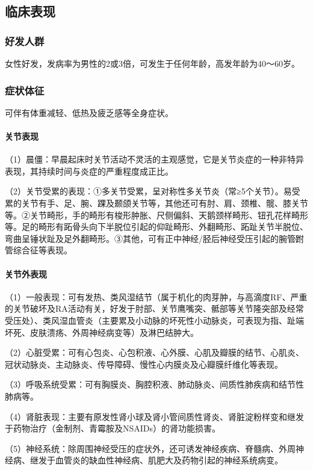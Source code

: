 \subsection{临床表现}

\subsubsection{好发人群}

女性好发，发病率为男性的2或3倍，可发生于任何年龄，高发年龄为40～60岁。

\subsubsection{症状体征}

可伴有体重减轻、低热及疲乏感等全身症状。
\paragraph{关节表现}

（1）晨僵：早晨起床时关节活动不灵活的主观感觉，它是关节炎症的一种非特异表现，其持续时间与炎症的严重程度成正比。

（2）关节受累的表现：①多关节受累，呈对称性多关节炎（常≥5个关节）。易受累的关节有手、足、腕、踝及颞颌关节等，其他还可有肘、肩、颈椎、髋、膝关节等。②关节畸形，手的畸形有梭形肿胀、尺侧偏斜、天鹅颈样畸形、钮孔花样畸形等。足的畸形有跖骨头向下半脱位引起的仰趾畸形、外翻畸形、跖趾关节半脱位、弯曲呈锤状趾及足外翻畸形。③其他，可有正中神经/胫后神经受压引起的腕管∕跗管综合征等表现。
\paragraph{关节外表现}

（1）一般表现：可有发热、类风湿结节（属于机化的肉芽肿，与高滴度RF、严重的关节破坏及RA活动有关，好发于肘部、关节鹰嘴突、骶部等关节隆突部及经常受压处）、类风湿血管炎（主要累及小动脉的坏死性小动脉炎，可表现为指、趾端坏死、皮肤溃疡、外周神经病变等）及淋巴结肿大。

（2）心脏受累：可有心包炎、心包积液、心外膜、心肌及瓣膜的结节、心肌炎、冠状动脉炎、主动脉炎、传导障碍、慢性心内膜炎及心瓣膜纤维化等表现。

（3）呼吸系统受累：可有胸膜炎、胸腔积液、肺动脉炎、间质性肺疾病和结节性肺病等。

（4）肾脏表现：主要有原发性肾小球及肾小管间质性肾炎、肾脏淀粉样变和继发于药物治疗（金制剂、青霉胺及NSAIDs）的肾功能损害。

（5）神经系统：除周围神经受压的症状外，还可诱发神经疾病、脊髓病、外周神经病、继发于血管炎的缺血性神经病、肌肥大及药物引起的神经系统病变。

